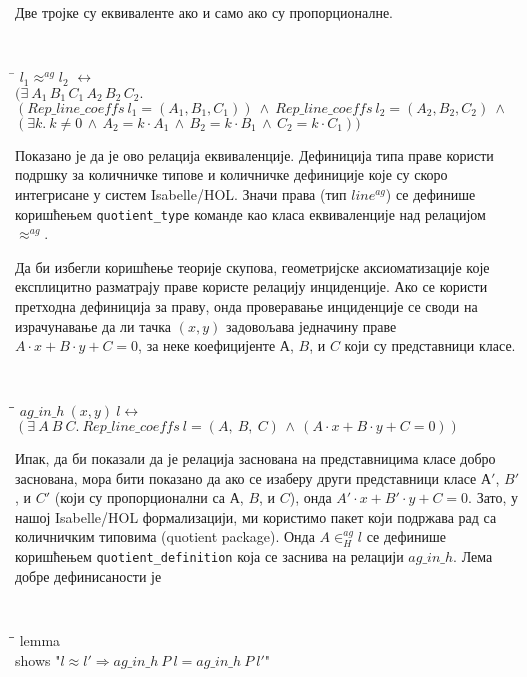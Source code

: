 \documentclass[a4paper, 12pt]{article}
\newcommand{\aginh}[2]{\ensuremath{#1 \in^{ag}_H #2}}
\begin{document}
Две тројке су еквиваленте ако и само ако су пропорционалне.
{\tt
\begin{tabbing}
\hspace{5mm}\=\kill
$l_1 \approx^{ag} l_2$ $\longleftrightarrow$ \\
\>  $(\exists\ A_1\,B_1\,C_1\,A_2\,B_2\,C_2.$\\
\>  $(\mathit{Rep\_line\_coeffs}\ l_1 = (A_1, B_1, C_1)) \ \wedge\ \mathit{Rep\_line\_coeffs}\ l_2 = (A_2, B_2, C_2)\ \wedge$\\
\>  $(\exists k.\ k \neq 0 \,\wedge\, A_2 = k\cdot A_1 \,\wedge\,  B_2 = k\cdot B_1\,\wedge\,C_2 = k\cdot C_1))$
\end{tabbing}
}
\noindent Показано је да је ово релација еквиваленције. Дефиниција
типа праве користи подршку за количничке типове и количничке
дефиниције које су скоро интегрисане у систем Isabelle/HOL. Значи
права (тип $\mathit{line^{ag}}$) се дефинише коришћењем
\verb|quotient_type| команде као класа еквиваленције над релацијом
$\approx^{ag}$.

Да би избегли коришћење теорије скупова, геометријске аксиоматизације
које експлицитно разматрају праве користе релацију инциденције. Ако се
користи претходна дефиниција за праву, онда проверавање инциденције се
своди на израчунавање да ли тачка $(x, y)$ задовољава једначину праве
$A\cdot x + B\cdot y + C = 0$, за неке коефицијенте $А$, $B$, и $C$
који су представници класе.
{\tt
\begin{tabbing}
\hspace{5mm}\=\hspace{5mm}\=\kill
$ag\_in\_h\ (x, y)\ l \longleftrightarrow$\\
\>$(\exists\ A\ B\ C.\ \mathit{Rep\_line\_coeffs}\ l = (A,\ B,\ C) \,\wedge\,  (A\cdot x + B\cdot y + C = 0))$
\end{tabbing}
}

Ипак, да би показали да је релација заснована на представницима класе
добро заснована, мора бити показано да ако се изаберу други
представници класе $А'$, $B'$, и $C'$ (који су пропорционални са $А$,
$B$, и $C$), онда $A'\cdot x + B'\cdot y + C = 0$. Зато, у нашој
Isabelle/HOL формализацији, ми користимо пакет који подржава рад са
количничким типовима (quotient package). Онда $\aginh{A}{l}$ се
дефинише коришћењем \verb|quotient_definition| која се заснива на
релацији $ag\_in\_h$. Лема добре дефинисаности је
{\tt
\begin{tabbing}
\hspace{5mm}\=\hspace{5mm}\=\kill
lemma \\
\>shows "$l \approx l' \Longrightarrow ag\_in\_h\ P\ l = ag\_in\_h\ P\ l'$"
\end{tabbing}
}
\end{document}
